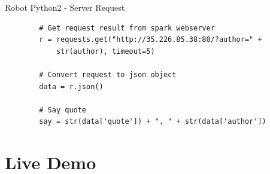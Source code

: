 	\begin{frame}[fragile]{Robot Python2 - Server Request}
		\begin{verbatim}
		# Get request result from spark webserver
		r = requests.get("http://35.226.85.38:80/?author=" + 
		    str(author), timeout=5)
		
		# Convert request to json object
		data = r.json()
	
		# Say quote
		say = str(data['quote']) + ". " + str(data['author'])
		\end{verbatim}
	\end{frame}

\section{Live Demo}

\frame{\sectionpage}